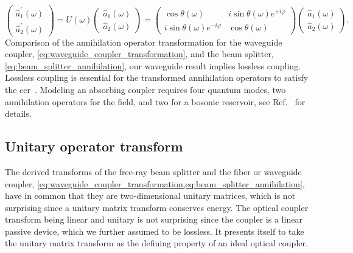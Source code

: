 \begin{equation}
	\begin{pmatrix}
        \hat{a}_1^\prime(\omega) \\
        \hat{a}_2^\prime(\omega)
    \end{pmatrix}
    =
    U(\omega)
    \begin{pmatrix}
        \hat{a}_1(\omega) \\
        \hat{a}_2(\omega)
    \end{pmatrix}
    =
    \begin{pmatrix}
        \cos\theta(\omega) & i\sin\theta(\omega)e^{+i\varphi} 
        \\
        i\sin\theta(\omega)e^{-i\varphi} & \cos\theta(\omega)
    \end{pmatrix}
    \begin{pmatrix}
        \hat{a}_1(\omega) \\
        \hat{a}_2(\omega)
    \end{pmatrix}
    \label{eq:waveguide_coupler_transformation}
    .
\end{equation}
Comparison of the annihilation operator transformation for the waveguide coupler, \cref{eq:waveguide_coupler_transformation}, and the beam splitter, \cref{eq:beam_splitter_annihilation}, our waveguide result implies lossless coupling.
Lossless coupling is essential for the transformed annihilation operators to satisfy the \gls{ccr}~\cite[p.~38]{Gerry2005}.
Modeling an absorbing coupler requires four quantum modes, two annihilation operators for the field, and two for a bosonic reservoir, see Ref.~\cite[p.~210]{Vogel2006} for details.

\subsection{Unitary operator transform}

The derived transforms of the free-ray beam splitter and the fiber or waveguide coupler, \cref{eq:waveguide_coupler_transformation,eq:beam_splitter_annihilation}, have in common that they are two-dimensional unitary matrices, which is not surprising since a unitary matrix transform conserves energy.
The optical coupler transform being linear and unitary is not surprising since the coupler is a linear passive device, which we further assumed to be lossless.
It presents itself to take the unitary matrix transform as the defining property of an ideal optical coupler.

